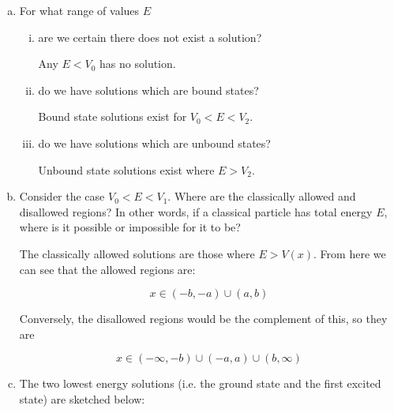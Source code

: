 \documentclass[10pt]{article}
\begin{document}
    \begin{enumerate}[(a)]
        \item For what range of values $E$ 
        \begin{enumerate}[i.]
            \item are we certain there does not exist a solution?
            
            \begin{solution}
                Any $E < V_0$ has no solution.
            \end{solution}
            \item do we have solutions which are bound states?

            \begin{solution}
                Bound state solutions exist for $V_0 < E < V_2$.
            \end{solution}
            \item do we have solutions which are unbound states?
            
            \begin{solution}
                Unbound state solutions exist where $E > V_2$.
            \end{solution}
        \end{enumerate}
        \item Consider the case $V_0 < E < V_1$. Where are the classically allowed and disallowed regions? In other words, if a classical particle has total energy $E$, where is it possible or impossible for it to be?
        
        \begin{solution}
            The classically allowed solutions are those where $E > V(x)$. From here we can see that the allowed regions are:

            \[ x \in (-b, -a) \cup (a, b)\]

            Conversely, the disallowed regions would be the complement of this, so they are 
            
            \[x \in (-\infty, -b) \cup (-a, a) \cup (b, \infty)\]
        \end{solution}
        \item The two lowest energy solutions (i.e. the ground state and the first excited state) are sketched below:
        

\end{enumerate}
\end{document}
